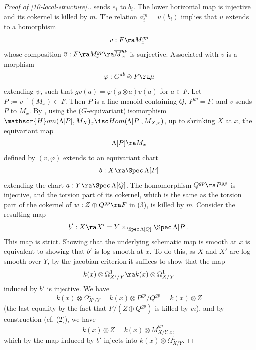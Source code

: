 \documentclass[10pt]{../fichiers-configuration-latex/smfart}
\begin{document}
\begin{proof}[Proof of \ref{10-local-structure}.]
sends $e_i$ to $b_i$. The lower horizontal map is injective and its cokernel
is killed by $m$. The relation $a_i^m = u(b_i)$ implies that $u$ extends
to a homorphism $$ v : F \ra M^{gp}_x $$ whose composition $\overline{v} :
F \ra M^{gp}_x \ra \overline{M}^{gp}_x$ is surjective. Associated with $v$
is a morphism $$ \varphi : G^{ab} \otimes F \ra \mu $$ extending $\psi$, such
that $gv(a) = \varphi(g \otimes a)v(a)$ for $a \in F$. Let $P := v^{-1}(M_x)
\subset F$. Then $P$ is a fine monoid containing $Q$, $P^{gp} = F$, and $v$
sends $P$ to $M_x$. By \cite[2.10]{LSFI@Kato}, using the ($G$-equivariant)
isomorphism $\mathscr{H}om(\Lambda[P],M_X)_{x} \iso Hom(\Lambda[P],M_{X,x})$,
up to shrinking $X$ at $x$, the equivariant map $$ \Lambda[P] \ra M_x $$
defined by $(v,\varphi)$ extends to an equivariant chart $$ b : X \ra
\Spec \,\Lambda[P] $$ extending the chart $a : Y \ra \Spec \,\Lambda[Q]$. The
homomorphism $Q^{gp} \ra P^{gp}$ is injective, and the torsion part of its
cokernel, which is the same as the torsion part of the cokernel of $w :
Z \oplus Q^{gp} \ra F$ in (3), is killed by $m$. Consider the resulting map
$$ b' : X \ra X' = Y \times_{\Spec \,\Lambda[Q]} \Spec \, \Lambda[P].  $$ This
map is strict. Showing that the underlying schematic map is smooth at $x$ is
equivalent to showing that $b'$ is log smooth at $x$. To do this, as $X$ and
$X'$ are log smooth over $Y$, by the jacobian criterion \cite[3.12]{LSFI@Kato}
it suffices to show that the map $$ k(x) \otimes \Omega^1_{X'/Y} \ra k(x)
\otimes \Omega^1_{X/Y} $$ induced by $b'$ is injective. We have $$ k(x)
\otimes \Omega^1_{X'/Y} = k(x) \otimes P^{gp}/Q^{gp} = k(x) \otimes Z $$
(the last equality by the fact that $F/(Z \oplus Q^{gp})$ is killed by $m$),
and by construction (cf. (2)), we have $$ k(x) \otimes Z = k(x) \otimes
\overline{M}^{gp}_{X/Y,x}, $$ which by the map induced by $b'$ injects into
$k(x) \otimes \Omega^1_{X/Y}$.


\end{proof}
\end{document}
